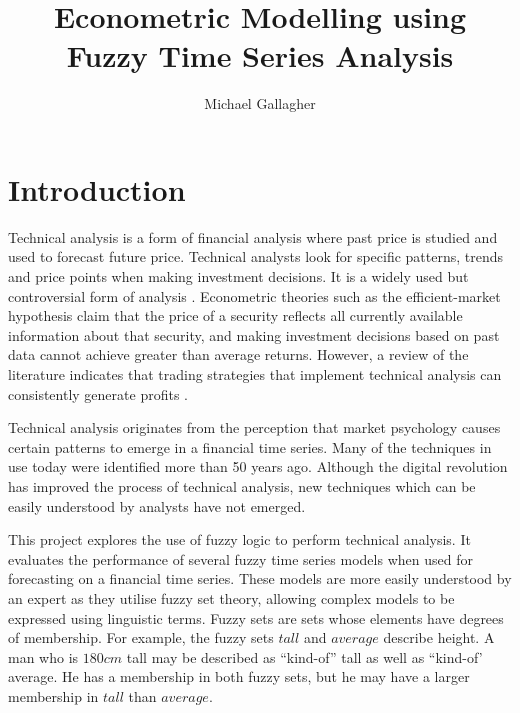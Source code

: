 \documentclass[12pt, oneside, a4paper]{article}
\title{Econometric Modelling using \\Fuzzy Time Series Analysis}
\author{Michael Gallagher}
\theoremstyle{definition}
\begin{document}
\maketitle
\tableofcontents

\listoffigures

\listoftables

\newpage

\section{Introduction}

Technical analysis is a form of financial analysis where past price is studied and used to forecast future price. Technical analysts look for specific patterns, trends and price points when making investment decisions. It is a widely used but controversial form of analysis \citep{foundations}. Econometric theories such as the efficient-market hypothesis claim that the price of a security reflects all currently available information about that security, and making investment decisions based on past data cannot achieve greater than average returns. However, a review of the literature indicates that trading strategies that implement technical analysis can consistently generate profits \citep{taprofitability}.

Technical analysis originates from the perception that market psychology causes certain patterns to emerge in a financial time series. Many of the techniques in use today were identified more than 50 years ago. Although the digital revolution has improved the process of technical analysis, new techniques which can be easily understood by analysts have not emerged.

This project explores the use of fuzzy logic to perform technical analysis. It evaluates the performance of several fuzzy time series models when used for forecasting on a financial time series. These models are more easily understood by an expert as they utilise fuzzy set theory, allowing complex models to be expressed using linguistic terms. Fuzzy sets are sets whose elements have degrees of membership. For example, the fuzzy sets $tall$ and $average$ describe height. A man who is $180cm$ tall may be described as ``kind-of'' tall as well as ``kind-of' average. He has a membership in both fuzzy sets, but he may have a larger membership in $tall$ than $average$.
\end{document}
